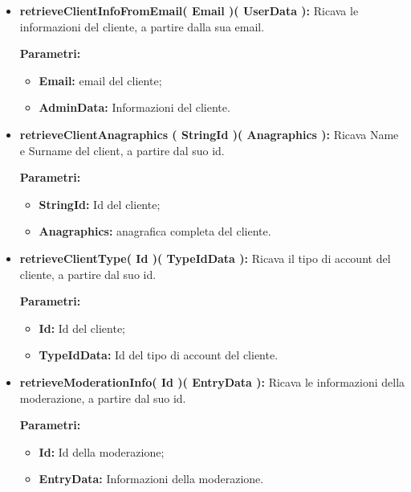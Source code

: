 \begin{itemize}
\begin{itemize}
			\item \textbf{retrieveClientInfoFromEmail( Email )( UserData ):} Ricava le informazioni del cliente, a partire dalla sua email.
				\begin{description}
					\item[\textbf{Parametri:}]
				\end{description}
				\begin{itemize}
					\item \textbf{Email:} email del cliente;
					\item \textbf{AdminData:} Informazioni del cliente.
				\end{itemize}	
			
				
			\item \textbf{retrieveClientAnagraphics ( StringId )( Anagraphics ):} Ricava Name e Surname del client, a partire dal suo id.
				\begin{description}
    				\item[\textbf{Parametri:}]
				\end{description}
				\begin{itemize}
					\item \textbf{StringId:} Id del cliente;
					\item \textbf{Anagraphics:} anagrafica completa del cliente.
				\end{itemize}
				
			\item \textbf{retrieveClientType( Id )( TypeIdData ):} Ricava il tipo di account del cliente, a partire dal suo id.
				\begin{description}
    				\item[\textbf{Parametri:}]
				\end{description}
				\begin{itemize}
					\item \textbf{Id:} Id del cliente;
					\item \textbf{TypeIdData:} Id del tipo di account del cliente.
				\end{itemize}
			
			\item \textbf{retrieveModerationInfo( Id )( EntryData ):} Ricava le informazioni della moderazione, a partire dal suo id.
				\begin{description}
    				\item[\textbf{Parametri:}]
				\end{description}
				\begin{itemize}
					\item \textbf{Id:} Id della moderazione;
					\item \textbf{EntryData:} Informazioni della moderazione.
				\end{itemize}
				

\end{itemize}
\end{itemize}
